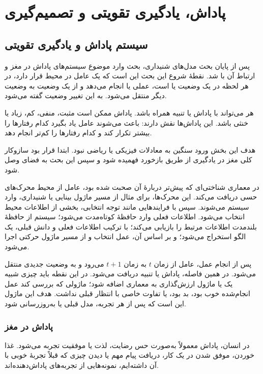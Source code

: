 \chapter{پاداش، یادگیری تقویتی و تصمیم‌گیری}

\section{سیستم پاداش و یادگیری تقویتی}
پس از پایان بحث مدل‌های شنیداری، بحث وارد موضوع سیستم‌های پاداش در مغز و ارتباط آن با  شد. نقطهٔ شروع این بحث این است که یک عامل در محیط قرار دارد، در هر لحظه در یک وضعیت یا  است، عملی یا  انجام می‌دهد و از یک وضعیت به وضعیت دیگر منتقل می‌شود. به این تغییر وضعیت  گفته می‌شود.

هر  می‌تواند با پاداش یا تنبیه همراه باشد. پاداش ممکن است مثبت، منفی، کم، زیاد یا خنثی باشد. این پاداش‌ها نقش  دارند: باعث می‌شوند عامل یاد بگیرد کدام رفتارها را بیشتر تکرار کند و کدام رفتارها را کم‌تر انجام دهد.

هدف این بخش ورود سنگین به معادلات فیزیکی یا ریاضی نبود. ابتدا قرار بود سازوکار کلی مغز در یادگیری از طریق بازخورد فهمیده شود و سپس این بحث به فضای  وصل شود.

در معماری شناختی‌ای که پیش‌تر دربارهٔ آن صحبت شده بود، عامل از محیط محرک‌های حسی دریافت می‌کند. این محرک‌ها، برای مثال از مسیر ماژول بینایی یا شنیداری، وارد سیستم می‌شوند. سپس با فرایندهایی مانند توجه انتخابی، بخشی از اطلاعات محیط انتخاب می‌شود. اطلاعات فعلی وارد حافظهٔ کوتاه‌مدت می‌شود؛ سیستم از حافظهٔ بلندمدت اطلاعات مرتبط را بازیابی می‌کند؛ با ترکیب اطلاعات فعلی و دانش قبلی، یک الگو استخراج می‌شود؛ و بر اساس آن، عمل انتخاب و از مسیر ماژول حرکتی اجرا می‌شود.

پس از انجام عمل، عامل از زمان \(t\) به زمان \(t+1\) می‌رود و به وضعیت جدیدی منتقل می‌شود. در همین فاصله، پاداش یا تنبیه دریافت می‌شود. در این نقطه باید چیزی شبیه یک  یا ماژول ارزش‌گذاری به معماری اضافه شود؛ ماژولی که بررسی کند عمل انجام‌شده خوب بود، بد بود، یا تفاوت خاصی با انتظار قبلی نداشت. هدف این ماژول این است که پس از هر تجربه، مدل قبلی یا  به‌روزرسانی شود.

\subsection{پاداش در مغز}
در انسان، پاداش معمولاً به‌صورت حس رضایت، لذت یا موفقیت تجربه می‌شود. غذا خوردن، موفق شدن در یک کار، دریافت پیام مهم یا دیدن چیزی که قبلاً تجربهٔ خوبی با آن داشته‌ایم، نمونه‌هایی از تجربه‌های پاداش‌دهنده‌اند.

